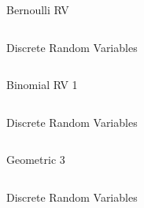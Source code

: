\documentclass[20pt,xcolor={dvipsnames}]{beamer}
\begin{document}
\begin{frame}

\vspace{-1cm}
\hspace{-0.5cm}
\Huge Bernoulli RV

\vspace{1cm}

\begin{columns}

Discrete Random Variables


\end{columns}

\end{frame}

\begin{frame}

\vspace{-1cm}
\hspace{-0.5cm}
\Huge Binomial RV 1

\vspace{1cm}

\begin{columns}

Discrete Random Variables


\end{columns}

\end{frame}


\begin{frame}

\vspace{-1cm}
\hspace{-0.5cm}
\Huge Geometric 3

\vspace{1cm}

\begin{columns}

Discrete Random Variables


\end{columns}

\end{frame}
\end{document}
